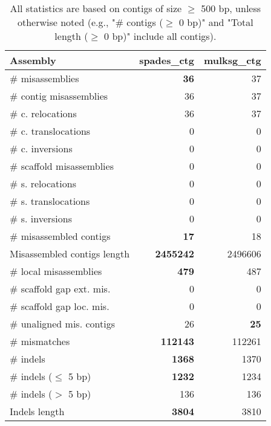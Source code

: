 \documentclass[12pt,a4paper]{article}
\begin{document}
\begin{table}[ht]
\begin{center}
\caption{All statistics are based on contigs of size $\geq$ 500 bp, unless otherwise noted (e.g., "\# contigs ($\geq$ 0 bp)" and "Total length ($\geq$ 0 bp)" include all contigs).}
\begin{tabular}{|l*{2}{|r}|}
\hline
Assembly & spades\_ctg & mulksg\_ctg \\ \hline
\# misassemblies & {\bf 36} & 37 \\ \hline
\hspace{2mm}\# contig misassemblies & 36 & 37 \\ \hline
\hspace{5mm}\# c. relocations & 36 & 37 \\ \hline
\hspace{5mm}\# c. translocations & 0 & 0 \\ \hline
\hspace{5mm}\# c. inversions & 0 & 0 \\ \hline
\hspace{2mm}\# scaffold misassemblies & 0 & 0 \\ \hline
\hspace{5mm}\# s. relocations & 0 & 0 \\ \hline
\hspace{5mm}\# s. translocations & 0 & 0 \\ \hline
\hspace{5mm}\# s. inversions & 0 & 0 \\ \hline
\# misassembled contigs & {\bf 17} & 18 \\ \hline
Misassembled contigs length & {\bf 2455242} & 2496606 \\ \hline
\# local misassemblies & {\bf 479} & 487 \\ \hline
\# scaffold gap ext. mis. & 0 & 0 \\ \hline
\# scaffold gap loc. mis. & 0 & 0 \\ \hline
\# unaligned mis. contigs & 26 & {\bf 25} \\ \hline
\# mismatches & {\bf 112143} & 112261 \\ \hline
\# indels & {\bf 1368} & 1370 \\ \hline
\hspace{5mm}\# indels ($\leq$ 5 bp) & {\bf 1232} & 1234 \\ \hline
\hspace{5mm}\# indels ($>$ 5 bp) & 136 & 136 \\ \hline
Indels length & {\bf 3804} & 3810 \\ \hline
\end{tabular}
\end{center}
\end{table}
\end{document}
